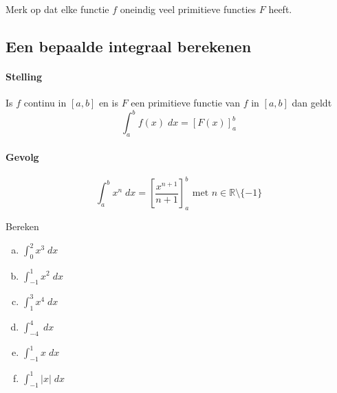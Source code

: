 \documentclass[a4paper,12pt, twoside]{article}
\begin{document}
Merk op dat elke functie $f$ oneindig veel primitieve functies $F$ heeft.

\subsection{Een bepaalde integraal berekenen}

\paragraph{Stelling}

Is $f$ continu in $[a,b]$ en is $F$ een primitieve functie van $f$ in $[a,b]$ dan geldt
$$\int_a^b f(x)\;dx = [F(x)]_a^b$$

\paragraph*{Gevolg}
$$\int_a^b x^n\;dx = \left[\dfrac{x^{n+1}}{n+1}\right]_a^b \mbox{ met } n\in\mathbb{R}\setminus\{-1\}$$

\begin{oefening}
Bereken
\begin{multicols}{3}
\begin{enumerate}[(a)]
  \itemsep1em
  \item $\displaystyle \int_0^2 x^3 \;dx$
  \item $\displaystyle \int_{-1}^{1} x^2 \;dx$
  \item $\displaystyle \int_1^3 x^4 \;dx$
  \item $\displaystyle \int_{-4}^4 \;dx$
  \item $\displaystyle \int_{-1}^{1} x \;dx$
  \item $\displaystyle \int_{-1}^{1} |x| \;dx$
\end{enumerate}
\end{multicols}
\end{oefening}
\end{document}
